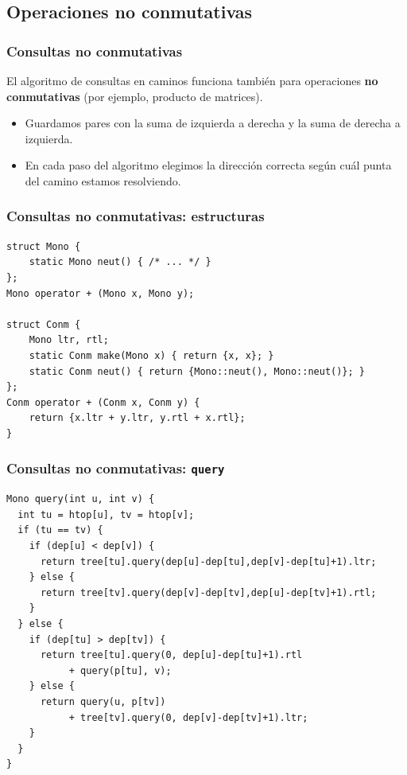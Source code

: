 \subsection{Operaciones no conmutativas}

\begin{frame}
  \frametitle{Consultas no conmutativas}

  El algoritmo de consultas en caminos funciona también para operaciones \textbf{no conmutativas} (por ejemplo, producto de matrices).

  \vspace{0.75em}

  \begin{itemize}
    \item Guardamos pares con la suma de izquierda a derecha y la suma de derecha a izquierda.
    \item En cada paso del algoritmo elegimos la dirección correcta según cuál punta del camino estamos resolviendo.
  \end{itemize}
\end{frame}

\begin{frame}[fragile]
  \frametitle{Consultas no conmutativas: estructuras}

\begin{lstlisting}
struct Mono {
    static Mono neut() { /* ... */ }
};
Mono operator + (Mono x, Mono y);

struct Conm {
    Mono ltr, rtl;
    static Conm make(Mono x) { return {x, x}; }
    static Conm neut() { return {Mono::neut(), Mono::neut()}; }
};
Conm operator + (Conm x, Conm y) {
    return {x.ltr + y.ltr, y.rtl + x.rtl};
}
\end{lstlisting}
\end{frame}

\begin{frame}[fragile]
  \frametitle{Consultas no conmutativas: \texttt{query}}

\begin{lstlisting}
Mono query(int u, int v) {
  int tu = htop[u], tv = htop[v];
  if (tu == tv) {
    if (dep[u] < dep[v]) {
      return tree[tu].query(dep[u]-dep[tu],dep[v]-dep[tu]+1).ltr;
    } else {
      return tree[tv].query(dep[v]-dep[tv],dep[u]-dep[tv]+1).rtl;
    }
  } else {
    if (dep[tu] > dep[tv]) {
      return tree[tu].query(0, dep[u]-dep[tu]+1).rtl
           + query(p[tu], v);
    } else {
      return query(u, p[tv])
           + tree[tv].query(0, dep[v]-dep[tv]+1).ltr;
    }
  }
}
\end{lstlisting}
\end{frame}
